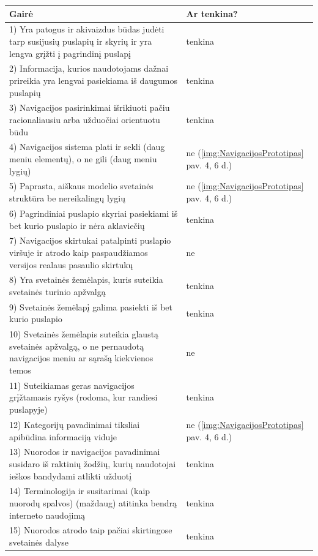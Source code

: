 \documentclass{VUMIFPSkursinis}
\begin{document}
\begin{longtable}{ |p{}|p{}| } 
 \hline
	Gairė & Ar tenkina? \\ \hline
	1) Yra patogus ir akivaizdus būdas judėti tarp susijusių puslapių ir skyrių ir yra lengva grįžti į pagrindinį puslapį & tenkina \\ \hline
	2) Informacija, kurios naudotojams dažnai prireikia yra lengvai pasiekiama iš daugumos puslapių & tenkina \\ \hline
	3) Navigacijos pasirinkimai išrikiuoti pačiu racionaliausiu arba užduočiai orientuotu būdu & tenkina \\ \hline
	4) Navigacijos sistema plati ir sekli (daug meniu elementų), o ne gili (daug meniu lygių)  & ne (\ref{img:NavigacijosPrototipas} pav. 4, 6 d.) \\ \hline
	5) Paprasta, aiškaus modelio svetainės struktūra be nereikalingų lygių & ne (\ref{img:NavigacijosPrototipas} pav. 4, 6 d.) \\ \hline
	6) Pagrindiniai puslapio skyriai pasiekiami iš bet kurio puslapio ir nėra aklaviečių & tenkina \\ \hline
	7) Navigacijos skirtukai patalpinti puslapio viršuje ir atrodo kaip paspaudžiamos versijos realaus pasaulio skirtukų & ne \\ \hline
	8) Yra svetainės žemėlapis, kuris suteikia svetainės turinio apžvalgą & tenkina \\ \hline
	9) Svetainės žemėlapį galima pasiekti iš bet kurio puslapio & tenkina \\ \hline
	10) Svetainės žemėlapis suteikia glaustą svetainės apžvalgą, o ne pernaudotą navigacijos meniu ar sąrašą kiekvienos temos & ne \\ \hline
	11) Suteikiamas geras navigacijos grįžtamasis ryšys (rodoma, kur randiesi puslapyje) & tenkina \\ \hline
	12) Kategorijų pavadinimai tiksliai apibūdina informaciją viduje & ne (\ref{img:NavigacijosPrototipas} pav. 4, 6 d.) \\ \hline
	13) Nuorodos ir navigacijos pavadinimai susidaro iš raktinių žodžių, kurių naudotojai ieškos bandydami atlikti užduotį & tenkina \\ \hline
	14) Terminologija ir susitarimai (kaip nuorodų spalvos) (maždaug) atitinka bendrą interneto naudojimą & tenkina \\ \hline
	15) Nuorodos atrodo taip pačiai skirtingose svetainės dalyse & tenkina \\ \hline

\end{longtable}
\end{document}
